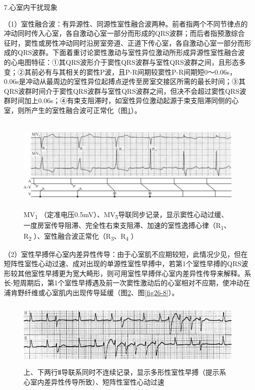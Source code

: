 7.心室内干扰现象

（1）室性融合波：有异源性、同源性室性融合波两种。前者指两个不同节律点的冲动同时传入心室，各自激动心室一部分而形成的QRS波群；而后者指预激综合征时，窦性或房性冲动同时沿房室旁道、正道下传心室，各自激动心室一部分而形成的QRS波群。下面着重讨论窦性激动与室性异位激动所形成异源性室性融合波的心电图特征：①其QRS波形介于窦性QRS波群与室性QRS波群之间，且形态多变；②其前必有与其相关的窦性P波，且P-R间期较窦性P-R间期短0～0.06s，0.06s是冲动从最周边的室性异位起搏点逆传至房室交接区所需的最长时间；③其QRS波群时间介于窦性QRS波群与室性QRS波群之间，但决不会超过窦性QRS波群时间加上0.06s；④有束支阻滞时，如室性异位激动起源于束支阻滞同侧的心室，则所产生的室性融合波可正常化（图\ref{fig26-6}）。

\begin{figure}[!htbp]
 \centering
 \includegraphics[width=5.80208in,height=1.8125in]{./images/Image00447.jpg}
 \captionsetup{justification=centering}
 \caption{MV\textsubscript{1} （定准电压0.5mV）、MV\textsubscript{5}导联同步记录，显示窦性心动过缓、一度房室传导阻滞、完全性右束支阻滞、加速的室性逸搏心律（R\textsubscript{1}、R\textsubscript{2} ）、室性融合波正常化（R\textsubscript{3}、R\textsubscript{4} ）}
 \label{fig26-6}
  \end{figure} 


（2）室性早搏伴心室内差异性传导：由于心室肌不应期较短，此情况少见，但在短阵性室性心动过速、成对出现的单源性室性早搏中，若第1个室性早搏的QRS波形较其他室性早搏更为宽大畸形，则可用室性早搏伴心室内差异性传导来解释。系长-短周期后，第1个室性早搏遇及前一次窦性激动后的心室相对不应期，使冲动在浦肯野纤维或心室肌内出现传导延缓（图\ref{fig26-7}、图\ref{fig26-8}）。

\begin{figure}[!htbp]
 \centering
 \includegraphics[width=5.58333in,height=1.29167in]{./images/Image00448.jpg}
 \captionsetup{justification=centering}
 \caption{上、下两行Ⅱ导联系同时不连续记录，显示多形性室性早搏（提示系心室内差异性传导所致）、短阵性室性心动过速}
 \label{fig26-7}
  \end{figure} 

